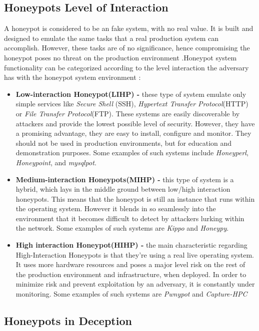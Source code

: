 \documentclass[grad,lot,lof,11pt,oneside,onehalfspace]{RUthesis}
\begin{document}
\subsection{Honeypots Level of Interaction}
A honeypot is considered to be an fake system, with no real value. It is built and designed to emulate the same tasks that a real production system can accomplish. However, these tasks are of no significance, hence compromising the honeypot poses no threat on the production environment .Honeypot system functionality can be categorized according to the level interaction the adversary has with the honeypot system environment \cite{lihet_how_2015}:
\begin{itemize}
	\item\textbf{Low-interaction Honeypot(LIHP) - }
	these type of system emulate only simple services like \textit{Secure Shell} (SSH), \textit{Hypertext Transfer Protocol}(HTTP) or \textit{File Transfer Protocol}(FTP). These systems are easily discoverable by attackers and provide the lowest possible level of security. However, they have a promising advantage, they are easy to install, configure and monitor. They should not be used in production environments, but for education and demonstration purposes. Some examples of such systems include \textit{Honeyperl}, \textit{Honeypoint}, and \textit{mysqlpot}.
	\item\textbf{Medium-interaction Honeypots(MIHP) -}
	this type of system is a hybrid, which lays in the middle ground between low/high interaction honeypots. This means that the honeypot is still an instance that runs within the operating system. However it blends in so seamlessly into the environment that it becomes difficult to detect by attackers lurking within the network. Some examples of such systems are \textit{Kippo} and \textit{Honeypy}.
	\item\textbf{High interaction Honeypot(HIHP) -}
	the main characteristic regarding High-Interaction Honeypots is that they're using a real live operating system. It uses more hardware resources and poses a major level risk on the rest of the production environment and infrastructure, when deployed. In order to minimize risk and prevent exploitation by an adversary, it is constantly under monitoring. Some examples of such systems are \textit{Pwnypot} and \textit{Capture-HPC}
\end{itemize}
\subsection{Honeypots in Deception}
\end{document}
